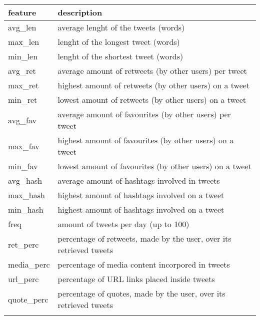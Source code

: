 \small
\begin{center}
	\begin{tabular}{ll}
		\\feature&description\\
		\hline\hline
		avg\_len&average lenght of the tweets (words)\\
		max\_len&lenght of the longest tweet (words)\\
		min\_len&lenght of the shortest tweet (words)\\
		avg\_ret&average amount of retweets (by other users) per tweet\\
		max\_ret&highest amount of retweets (by other users) on a tweet\\
		min\_ret&lowest amount of retweets (by other users) on a tweet\\
		avg\_fav&average amount of favourites (by other users) per tweet\\
		max\_fav&highest amount of favourites (by other users) on a tweet\\
		min\_fav&lowest amount of favourites (by other users) on a tweet\\
		avg\_hash&average amount of hashtags involved in tweets\\
		max\_hash&highest amount of hashtags involved on a tweet\\
		min\_hash&highest amount of hashtags involved on a tweet\\
		freq&amount of tweets per day (up to 100)\\
		ret\_perc&percentage of retweets, made by the user, over its retrieved tweets\\
		media\_perc&percentage of media content incorpored in tweets\\
		url\_perc&percentage of URL links placed inside tweets\\
		quote\_perc&percentage of quotes, made by the user, over its retrieved tweets\\\hline\\
	\end{tabular}
\end{center}
\normalsize

